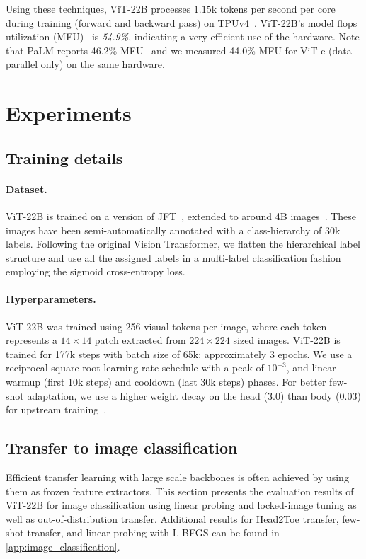 \documentclass{article}
\newcommand{\chonk}{\mbox{ViT-22B}\xspace}
\begin{document}
Using these techniques, \chonk processes $1.15$k tokens per second per core during training (forward and backward pass) on TPUv4~\citep{jouppi2020domain}. 
\chonk's model flops utilization (MFU)~\citep{chowdhery2022palm,dehghani2021efficiency} is \emph{54.9\%}, indicating a very efficient use of the hardware. Note that PaLM reports 46.2\% MFU~\citep{chowdhery2022palm, pope2022efficiently} and we measured 44.0\% MFU for ViT-e (data-parallel only) on the same hardware.
\section{Experiments}
\label{sec:evaluation}

\subsection{Training details}
\label{sec:training}
\paragraph{Dataset.}
\chonk is trained on a version of JFT~\citep{sun2017revisiting}, extended to around 4B images~\citep{zhai2022scaling}.
These images have been semi-automatically annotated with a class-hierarchy of 30k labels.
Following the original Vision Transformer, we flatten the hierarchical label structure and use all the assigned labels in a multi-label classification fashion employing the sigmoid cross-entropy loss.

\paragraph{Hyperparameters.}
\chonk was trained using 256 visual tokens per image, where each token represents a $14 \times 14$ patch extracted from $224 \times 224$ sized images. 
\chonk is trained for 177k steps with batch size of 65k: approximately 3 epochs.
We use a reciprocal square-root learning rate schedule with a peak of $10^{-3}$, and linear warmup (first 10k steps) and cooldown (last 30k steps) phases. For better few-shot adaptation, we use a higher weight decay on the head ($3.0$) than body ($0.03$) for upstream training~\citep{zhai2022scaling, abnar2021exploring}. 

\subsection{Transfer to image classification}
Efficient transfer learning with large scale backbones is often achieved by using them as frozen feature extractors. This section presents the evaluation results of \chonk for image classification using linear probing and locked-image tuning as well as out-of-distribution transfer. Additional results for  Head2Toe transfer, few-shot transfer, and linear probing with L-BFGS can be found in \cref{app:image_classification}.
\end{document}
